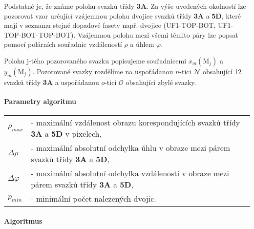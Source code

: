 	Podstatné je, že známe polohu svazků třídy \textbf{3A}. Za výše uvedených okolností lze pozorovat vzor určující vzájemnou polohu dvojice svazků třídy \textbf{3A} a \textbf{5D}, které mají v seznamu stejné dopadové fasety např. dvojice (UF1-TOP-BOT, UF1-TOP-BOT-TOP-BOT). Vzájemnou polohu mezi všemi těmito páry lze popsat pomocí polárních souřadnic vzdáleností $\rho$ a úhlem $\varphi$. 
	
	Polohu j-tého pozorovaného svazku popisujeme souřadnicemi $x_m(\mathrm{M}_j)$ a $y_m(\mathrm{M}_j)$. Pozorované svazky rozdělíme na uspořádanou $n$-tici $\mathcal{N}$ obsahující 12 svazků třídy \textbf{3A} a uspořádanou $o$-tici $\mathcal{O}$ obsahující zbylé svazky. 

\paragraph{Parametry algoritmu}
\hspace{1mm}

	 \begin{tabular}{l L{14cm}}
	 $\rho_{max}$ & - maximální vzdálenost obrazu korespondujících svazků třídy \textbf{3A} a \textbf{5D} v pixelech,\\
	 $\Delta\rho$ & - maximální absolutní odchylka úhlu v obraze mezi párem svazků třídy \textbf{3A} a \textbf{5D},\\
	 $\Delta\varphi$ & - maximální absolutní odchylka vzdálenosti v obraze mezi párem svazků třídy \textbf{3A} a \textbf{5D},\\
	 $p_{min}$ & - minimální počet nalezených dvojic.\\
	 \end{tabular}

\paragraph{Algoritmus}

